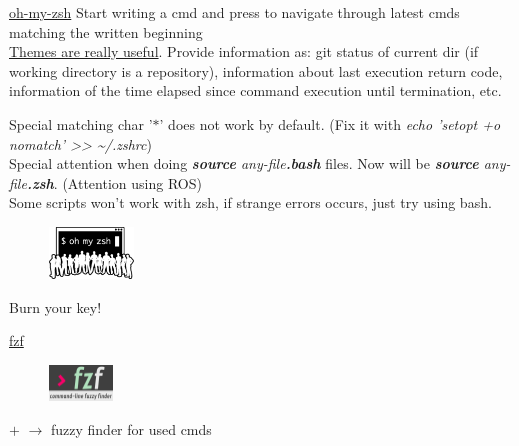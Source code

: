 \documentclass[10pt,a4paper]{article}
\begin{document}
\begin{multicols}{3}
\begin{textbox}{\href{https://ohmyz.sh/}{oh-my-zsh}}
Start writing a cmd and press \keystroke{$\uparrow$} \keystroke{$\downarrow$} to navigate through latest cmds matching the written beginning \\

\href{https://github.com/romkatv/powerlevel10k}{Themes are really useful}. Provide information as: git status of current dir (if working directory is a repository), information about last execution return code, information of the time elapsed since command execution until termination, etc. 


Special matching char '$*$' does not work by default. (Fix it with \textit{echo 'setopt +o nomatch' >> \textasciitilde/.zshrc})\\

Special attention when doing \textit{\textbf{source} any-file\textbf{.bash}} files. Now will be \textit{\textbf{source} any-file\textbf{.zsh}}. (Attention using ROS)\\


Some scripts won't work with zsh, if strange errors occurs, just try using bash.

\begin{figure}
\vspace{-6mm}\includegraphics[width=0.2\textwidth]{images/omz.png}
\end{figure}

Burn your  key! 

\end{textbox}




\begin{textbox}{\href{https://github.com/junegunn/fzf}{fzf}}
\begin{figure}
 \vspace{-4mm}\includegraphics[width=0.15\textwidth]{images/fzf.png}
\end{figure}

 $+$  $\rightarrow$ fuzzy finder for used cmds 


\end{textbox}
\end{multicols}
\end{document}

